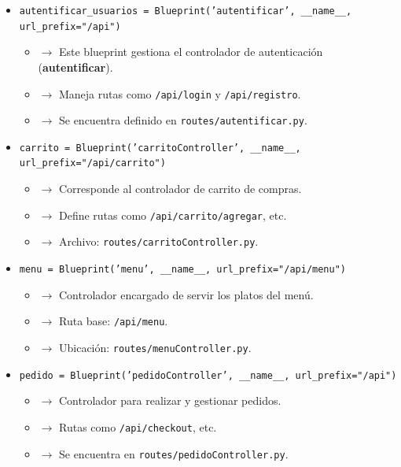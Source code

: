 \documentclass[10pt]{book}
\begin{document}
\begin{itemize}
    \item \texttt{autentificar\_usuarios = Blueprint('autentificar', \_\_name\_\_, url\_prefix="/api")}
    \begin{itemize}
        \item $\rightarrow$ Este blueprint gestiona el controlador de autenticación (\textbf{autentificar}).
        \item $\rightarrow$ Maneja rutas como \texttt{/api/login} y \texttt{/api/registro}.
        \item $\rightarrow$ Se encuentra definido en \texttt{routes/autentificar.py}.
    \end{itemize}

    \item \texttt{carrito = Blueprint('carritoController', \_\_name\_\_, url\_prefix="/api/carrito")}
    \begin{itemize}
        \item $\rightarrow$ Corresponde al controlador de carrito de compras.
        \item $\rightarrow$ Define rutas como \texttt{/api/carrito/agregar}, etc.
        \item $\rightarrow$ Archivo: \texttt{routes/carritoController.py}.
    \end{itemize}

    \item \texttt{menu = Blueprint('menu', \_\_name\_\_, url\_prefix="/api/menu")}
    \begin{itemize}
        \item $\rightarrow$ Controlador encargado de servir los platos del menú.
        \item $\rightarrow$ Ruta base: \texttt{/api/menu}.
        \item $\rightarrow$ Ubicación: \texttt{routes/menuController.py}.
    \end{itemize}

    \item \texttt{pedido = Blueprint('pedidoController', \_\_name\_\_, url\_prefix="/api")}
    \begin{itemize}
        \item $\rightarrow$ Controlador para realizar y gestionar pedidos.
        \item $\rightarrow$ Rutas como \texttt{/api/checkout}, etc.
        \item $\rightarrow$ Se encuentra en \texttt{routes/pedidoController.py}.
    \end{itemize}


\end{itemize}
\end{document}
